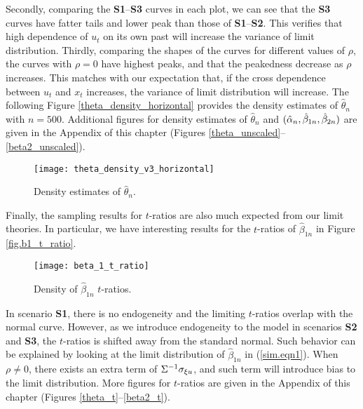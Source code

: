 Secondly, comparing the {\bf S1}--{\bf S3} curves in each plot, we can see that the {\bf S3} curves have fatter tails and lower peak than those of {\bf S1}--{\bf S2}. This verifies that high dependence of $u_t$ on its own past will increase the variance of limit distribution. Thirdly, comparing the shapes of the curves for different values of $\rho$, the curves with $\rho = 0$ have highest peaks, and that the peakedness decrease as $\rho$ increases. This matches with our expectation that, if the cross dependence between $u_t$ and $x_t$ increases, the variance of limit distribution will increase. The following Figure \ref{theta_density_horizontal} provides the density estimates of $\hat{\theta}_n$ with $n=500$. Additional figures for density estimates of $\hat{\theta}_n$  and $(\hat{\alpha}_n, \hat{\beta}_{1n}, \hat{\beta}_{2n})$ are given in the Appendix of this chapter (Figures \ref{theta_unscaled}--\ref{beta2_unscaled}).

\begin{figure}[hb]
  \centering
  \texttt{[image: theta\_density\_v3\_horizontal]}
  \caption{Density estimates of $\hat{\theta}_n$.}
\end{figure}


Finally, the sampling results for $t$-ratios are also much expected from our limit theories. In particular, we have interesting results for the $t$-ratios of $\hat{\beta}_{1n}$ in Figure \ref{fig.b1_t_ratio}. 

\begin{figure}[hb]   \centering
\texttt{[image: beta\_1\_t\_ratio]}
\caption{Density of $\hat{\beta}_{1n}$ $t$-ratios.}
\end{figure}


In scenario {\bf S1}, there is no endogeneity and the limiting $t$-ratios overlap with the normal curve. However, as we introduce endogeneity to the model in scenarios {\bf S2} and {\bf S3}, the $t$-ratios is shifted away from the standard normal. Such behavior can be explained by looking at the limit distribution of $\hat{\beta}_{1n}$ in (\ref{sim.eqn1}). When $\rho \ne 0$, there exists an extra term of $ \Sigma^{-1} \sigma_{\xi u}$, and such term will introduce bias to the limit distribution. More figures for $t$-ratios are given in the Appendix of this chapter (Figures \ref{theta_t}--\ref{beta2_t}).

